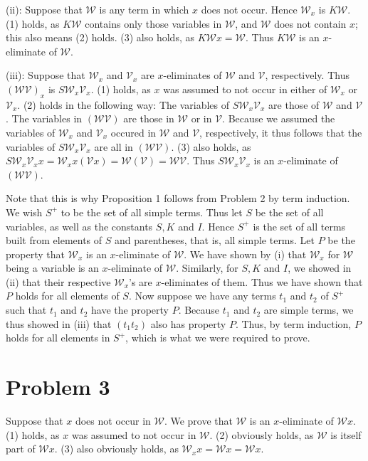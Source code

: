 \documentclass{article}
\theoremstyle{definition}
\begin{document}
(ii): Suppose that $\mathcal{W}$ is any term in which $x$ does not occur. Hence $\mathcal{W}_x$ is $K\mathcal{W}$. (1) holds, as 
$K\mathcal{W}$ contains only those variables in $\mathcal{W}$, and $\mathcal{W}$ does not contain $x$; this also means (2) holds. 
(3) also holds, as $K\mathcal{W}x=\mathcal{W}$. Thus $K\mathcal{W}$ is an $x$-eliminate of $\mathcal{W}$.


(iii): Suppose that $\mathcal{W}_x$ and $\mathcal{V}_x$ are $x$-eliminates of $\mathcal{W}$ and $\mathcal{V}$, respectively. Thus 
$(\mathcal{W}\mathcal{V})_x$ is $S\mathcal{W}_x\mathcal{V}_x$. (1) holds, as $x$ was assumed to not occur in either of $\mathcal{W}_x$ or $\mathcal{V}_x$. 
(2) holds in the following way: The variables of $S\mathcal{W}_x\mathcal{V}_x$ are those of $\mathcal{W}$ and $\mathcal{V}$. The variables in 
$(\mathcal{W}\mathcal{V})$ are those in $\mathcal{W}$ or in $\mathcal{V}$. 
Because we assumed the variables of $\mathcal{W}_x$ and $\mathcal{V}_x$ occured in $\mathcal{W}$ and $\mathcal{V}$, respectively, it thus 
follows that the variables of $S\mathcal{W}_x\mathcal{V}_x$ are all in $(\mathcal{W}\mathcal{V})$. (3) also holds, as 
$S\mathcal{W}_x\mathcal{V}_xx=\mathcal{W}_xx(\mathcal{V}x)=\mathcal{W}(\mathcal{V})=\mathcal{W}\mathcal{V}$. Thus $S\mathcal{W}_x\mathcal{V}_x$ is an $x$-eliminate of 
$(\mathcal{W}\mathcal{V})$.


Note that this is why Proposition 1 follows from Problem 2 by term induction. We wish $S^+$ to be the set of all simple terms. Thus let $S$ be the set of all variables, as 
well as the constants $S,K$ and $I$. Hence $S^+$ is the set of all terms built from elements of $S$ and parentheses, that is, all simple terms. Let $P$ be the property that 
$\mathcal{W}_x$ is an $x$-eliminate of $\mathcal{W}$. We have shown by (i) that 
$\mathcal{W}_x$ for $\mathcal{W}$ being a variable is an $x$-eliminate of $\mathcal{W}$. Similarly, for $S,K$ and $I$, we showed in (ii) that 
their respective $\mathcal{W}_x$'s are $x$-eliminates of them. Thus we have shown that $P$ holds for all elements of $S$. Now suppose we have any terms $t_1$ and $t_2$ 
of $S^+$ such that $t_1$ and $t_2$ have the property $P$. Because $t_1$ and $t_2$ are simple terms, we thus showed in (iii) that $(t_1t_2)$ also has property $P$. 
Thus, by term induction, $P$ holds for all elements in $S^+$, which is what we were required to prove. 

\section*{Problem 3}
Suppose that $x$ does not occur in $\mathcal{W}$. We prove that $\mathcal{W}$ is an $x$-eliminate of $\mathcal{W}x$. (1) holds, as 
$x$ was assumed to not occur in $\mathcal{W}$. (2) obviously holds, as $\mathcal{W}$ is itself part of $\mathcal{W}x$. (3) also obviously holds, as 
$\mathcal{W}_xx=\mathcal{W}x=\mathcal{W}x$.
\end{document}
